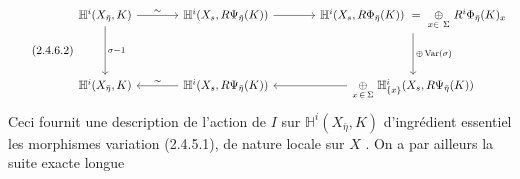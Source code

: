 \begin{equation}\tag{2.4.6.2}
\begin{tikzcd}[column sep=large, row sep=huge]
\mathbb{H}^i(X_{\bar\eta}, K) \arrow[r, "\sim"] \arrow[d, "\sigma-1"] & \mathbb{H}^i(X_s, R\Psi_{\bar\eta}(K)) \arrow[r] & \mathbb{H}^i(X_s, R\Phi_{\bar\eta}(K)) \ =\ \underset{x\in\ \Sigma}{\oplus}\ R^i\Phi_{\bar\eta}(K)_x \arrow[d, "{\oplus\, \mathrm{Var}(\sigma)}"] \\
\mathbb{H}^i(X_{\bar\eta}, K) & \mathbb{H}^i(X_s, R\Psi_{\bar\eta}(K)) \arrow[l, "\sim"'] & \underset{x\, \in\, \Sigma}{\oplus}\ \mathbb{H}^i_{\{x\}}(X_s, R\Psi_{\bar\eta}(K)) \arrow[l]
\end{tikzcd}
\end{equation}
Ceci fournit une description de l'action de $I$ sur $\mathbb{H}^i(X_{\bar\eta}, K)$ d'ingrédient essentiel les morphismes variation (2.4.5.1), de nature locale sur $X$ . On a par ailleurs la suite exacte longue

